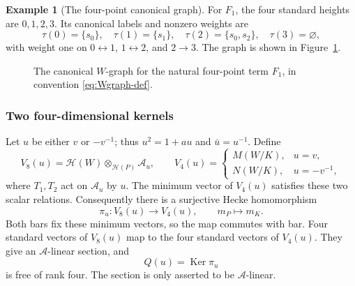 \documentclass[11pt]{article}
\numberwithin{equation}{section}
\theoremstyle{definition}
\newtheorem{example}[theorem]{Example}
\DeclareMathOperator{\Ker}{Ker}
\newcommand{\A}{\mathcal A}
\newcommand{\HH}{\mathcal H}
\newcommand{\emptypar}{\varnothing}
\begin{document}
\begin{example}[The four-point canonical graph]
For \(F_1\), the four standard heights are \(0,1,2,3\).
Its canonical labels and nonzero weights are
\[
 \tau(0)=\{s_0\},\quad\tau(1)=\{s_1\},\quad
 \tau(2)=\{s_0,s_2\},\quad\tau(3)=\emptypar,
\]
with weight one on \(0\leftrightarrow1\), \(1\leftrightarrow2\), and \(2\to3\).
The graph is shown in Figure~\ref{fig:B3graph}.
\end{example}

\begin{figure}[htbp]
\centering
{}
\caption{The canonical \(W\)-graph for the natural four-point term \(F_1\), in convention \eqref{eq:Wgraph-def}.}
\label{fig:B3graph}
\end{figure}

\subsubsection{Two four-dimensional kernels}

Let \(u\) be either \(v\) or \(-v^{-1}\); thus \(u^2=1+au\) and \(\bar u=u^{-1}\).
Define
\[
 V_8(u)=\HH(W)\otimes_{\HH(P)}\A_u,\qquad
 V_4(u)=
 \begin{cases}M(W/K),&u=v,\\N(W/K),&u=-v^{-1},\end{cases}
\]
where \(T_1,T_2\) act on \(\A_u\) by \(u\).
The minimum vector of \(V_4(u)\) satisfies these two scalar relations.
Consequently there is a surjective Hecke homomorphism
\begin{equation}
 \pi_u:V_8(u)\longrightarrow V_4(u),\qquad m_P\longmapsto m_K .
 \label{eq:B3surjection}
\end{equation}
Both bars fix these minimum vectors, so the map commutes with bar.
Four standard vectors of \(V_8(u)\) map to the four standard vectors of \(V_4(u)\).
They give an \(\A\)-linear section, and
\[
 Q(u)=\Ker\pi_u
\]
is free of rank four.
The section is only asserted to be \(\A\)-linear.
\end{document}
